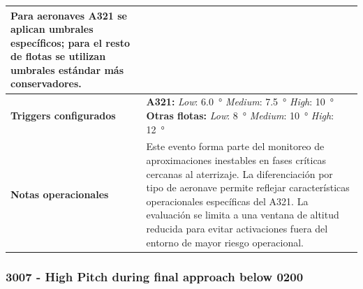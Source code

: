 \documentclass[11pt,a4paper]{article}
\begin{document}
\begin{longtable}{p{5cm} p{9.5cm}}
		Para aeronaves A321 se aplican umbrales específicos; para el resto de flotas se utilizan umbrales estándar más conservadores. \\
		\hline
		\textbf{Triggers configurados} &
		\textbf{A321:} \newline
		\textit{Low}: \SI{6.0}{\degree} \newline
		\textit{Medium}: \SI{7.5}{\degree} \newline
		\textit{High}: \SI{10}{\degree} \newline
		\newline
		\textbf{Otras flotas:} \newline
		\textit{Low}: \SI{8}{\degree} \newline
		\textit{Medium}: \SI{10}{\degree} \newline
		\textit{High}: \SI{12}{\degree} \\
		\hline
		\textbf{Notas operacionales} &
		Este evento forma parte del monitoreo de aproximaciones inestables en fases críticas cercanas al aterrizaje.  
		La diferenciación por tipo de aeronave permite reflejar características operacionales específicas del A321.  
		La evaluación se limita a una ventana de altitud reducida para evitar activaciones fuera del entorno de mayor riesgo operacional. \\
		\hline
	\end{longtable}
	
	\subsubsection{3007 - High Pitch during final approach below 0200}
	
\end{document}
